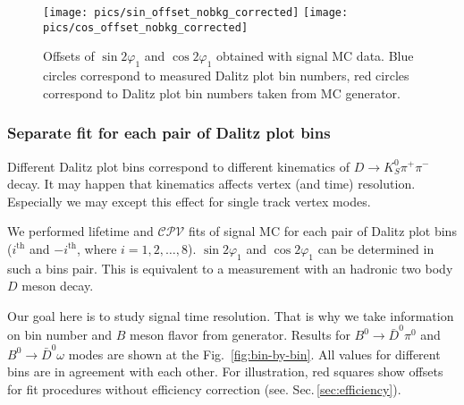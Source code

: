 \documentclass[preprint,aps,showpacs]{revtex4}
\newcommand{\cpvconj}{\ensuremath{\mathcal{CPV}}\xspace}
\newcommand{\dkpp}{\ensuremath{D\to K^0_S\pi^+\pi^-}\xspace}
\newcommand{\sindbeta}{\ensuremath{\sin{2\varphi_1}}\xspace}
\newcommand{\cosdbeta}{\ensuremath{\cos{2\varphi_1}}\xspace}
\newcommand{\bdpi}{\ensuremath{B^0\to \bar D^0\pi^0}\xspace}
\newcommand{\bdomega}{\ensuremath{B^0\to \bar D^0\omega}\xspace}
\begin{document}
\begin{figure}[htb]
 \texttt{[image: pics/sin\_offset\_nobkg\_corrected]}
 \texttt{[image: pics/cos\_offset\_nobkg\_corrected]}
 \caption{Offsets of \sindbeta and \cosdbeta obtained with signal MC data. Blue circles correspond to measured Dalitz plot bin numbers, red circles correspond to Dalitz plot bin numbers taken from MC generator.}
 \label{fig:mc_cpv_offsets}
\end{figure}

\subsubsection{Separate fit for each pair of Dalitz plot bins}\label{sec:mc_cpv_dalitz_bins}
Different Dalitz plot bins correspond to different kinematics of \dkpp decay. It may happen that kinematics affects vertex (and time) resolution. Especially we may except this effect for single track vertex modes.

We performed lifetime and \cpvconj fits of signal MC for each pair of Dalitz plot bins ($i^{\text{th}}$ and $-i^{\text{th}}$, where $i = 1, 2, \dots, 8$). \sindbeta and \cosdbeta can be determined in such a bins pair. This is equivalent to a measurement with an hadronic two body $D$ meson decay.

Our goal here is to study signal time resolution. That is why we take information on bin number and $B$ meson flavor from generator. Results for \bdpi and \bdomega modes are shown at the Fig.~\ref{fig:bin-by-bin}. All values for different bins are in agreement with each other. For illustration, red squares show offsets for fit procedures without efficiency correction (see. Sec.\,\ref{sec:efficiency}).
\end{document}
